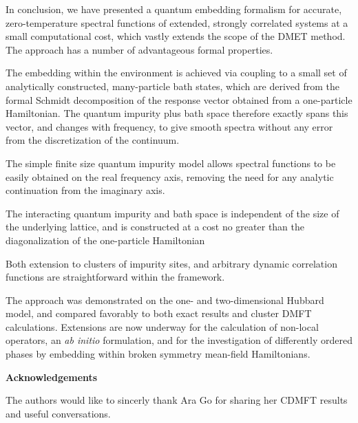 \documentclass[aps,twocolumn,nobibnotes]{revtex4}
\begin{document}
In conclusion, we have presented a quantum embedding formalism for accurate, zero-temperature spectral functions of extended, strongly correlated systems 
at a small computational cost, which vastly 
extends the scope of the DMET method. The approach has a number of 
advantageous formal properties. 
\begin{inparaenum}
\item The embedding within the environment is achieved via coupling to a small set of analytically constructed, many-particle bath states,
    which are derived from the formal Schmidt decomposition of the response vector obtained from a one-particle Hamiltonian. The quantum impurity
    plus bath space therefore exactly spans this vector, and
    changes with frequency, to give smooth spectra without any error from the discretization of the continuum.
\item The simple finite size quantum impurity model allows spectral functions to be easily obtained on the real frequency axis, removing the 
    need for any analytic continuation from the imaginary axis.
\item The interacting quantum impurity and bath space is independent of the size of the underlying lattice, and is constructed at a cost no greater than the
    diagonalization of the one-particle Hamiltonian
\item Both extension to clusters of impurity sites, and arbitrary dynamic correlation functions are straightforward within the framework.
\end{inparaenum}
The approach was demonstrated on the one- and two-dimensional Hubbard model, and compared favorably to both exact results and cluster DMFT calculations. Extensions are now underway for the
calculation of non-local operators, an {\em ab initio} formulation, and for the investigation of differently ordered phases by embedding within broken symmetry mean-field Hamiltonians.

{\bf Acknowledgements}

The authors would like to sincerly thank Ara Go for sharing her CDMFT results and useful conversations.


\end{document}
